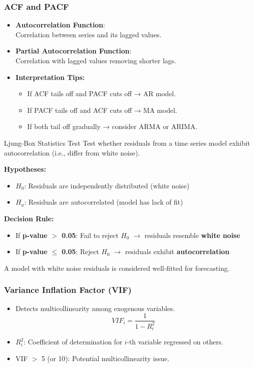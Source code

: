 \documentclass[12pt, aspectratio=169]{beamer}
\begin{document}
\begin{frame}
\frametitle{ACF and PACF}
\begin{itemize}
    \item \textbf{Autocorrelation Function}:\\ Correlation between series and its lagged values.
    \item \textbf{Partial Autocorrelation Function}:\\ Correlation with lagged values removing shorter lags.
    \item \textbf{Interpretation Tips:}
    \begin{itemize}
        \item If ACF tails off and PACF cuts off → AR model.
        \item If PACF tails off and ACF cuts off → MA model.
        \item If both tail off gradually → consider ARMA or ARIMA.
    \end{itemize}
\end{itemize}
\end{frame}

\begin{frame}{Ljung-Box Statistics Test}
    Test whether residuals from a time series model exhibit autocorrelation (i.e., differ from white noise). 
    
    \vspace{0.2cm}
    \textbf{Hypotheses:}
    \begin{itemize}
        \item $H_0$: Residuals are independently distributed (white noise)
        \item $H_a$: Residuals are autocorrelated (model has lack of fit)
    \end{itemize}
    \textbf{Decision Rule:}
    \begin{itemize}
        \item If \textbf{p-value $>$ 0.05}: Fail to reject $H_0$ $\rightarrow$ residuals resemble \textbf{white noise}
        \item If \textbf{p-value $\leq$ 0.05}: Reject $H_0$ $\rightarrow$ residuals exhibit \textbf{autocorrelation}
    \end{itemize}
    
    \vspace{0.2cm}
    A model with white noise residuals is considered well-fitted for forecasting.
\end{frame}

\begin{frame}
\frametitle{Variance Inflation Factor (VIF)}
\begin{itemize}
    \item Detects multicollinearity among exogenous variables.
    \[
    VIF_i = \frac{1}{1 - R_i^2}
    \]
    \item $R_i^2$: Coefficient of determination for $i$-th variable regressed on others.
    \item VIF $>$ 5 (or 10): Potential multicollinearity issue.
\end{itemize}
\end{frame}
\end{document}
